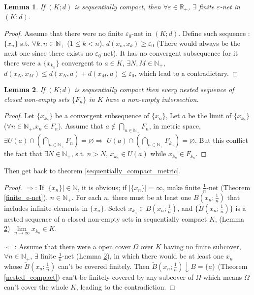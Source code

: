\documentclass[openany]{book}
\theoremstyle{plain}
\newtheorem{lemma}{Lemma} %
\theoremstyle{definition}
\begin{document}
\begin{lemma}\label{sequentially_compact_finite_e-net}
	If $(K;d)$ is sequentially compact, then $\forall \varepsilon\in\mathbb{R}_+$, $\exists$ finite $\varepsilon$-net in $(K;d)$. 
\end{lemma}
\begin{proof}
	Assume that there were no finite  $\varepsilon_0$-net in $(K;d)$. Define such sequence : $ \{x_n\}$ s.t. $\forall k,n\in\mathbb{N}_+$ ($1\leq k< n$), $d(x_n,x_k)\geq\varepsilon_0$ (There would always be the next one since there exists no $\varepsilon_0$-net). It has no convergent subsequence for it there were a $\{x_{k_n}\}$ convergent to $a\in K$, $\exists N,M\in\mathbb{N}_+$, $d(x_N,x_M)\leq d(x_N,a)+d(x_M,a)\leq \varepsilon_0$, which lead to a contradictary. 
\end{proof}
\begin{lemma}\label{sequentially_compact_nested_closed}
If $(K;d)$ is sequentially compact then every nested sequence of closed non-empty sets $\{F_n\}$ in $K$ have a non-empty intersection.
\end{lemma}
\begin{proof}
	Let $\{x_{k_n}\}$ be a convergent subsequence of $\{x_n\}$, Let $a$ be the limit of $\{x_{k_n}\}$ ($\forall n\in\mathbb{N}_+$,$x_n\in F_n$). Assume that $a\notin \bigcap_{n\in\mathbb{N}_+}F_n$, in metric space, $\exists U(a)\cap \left(\bigcap_{n\in\mathbb{N}_+}F_n\right)=\varnothing\Rightarrow $ $U(a)\cap \left(\bigcap_{n\in\mathbb{N}_+}F_{k_n}\right)=\varnothing$. But this conflict the fact that $\exists N\in\mathbb{N}_+$, s.t. $n>N$, $x_{k_n}\in U(a)$ while $x_{k_n}\in F_{k_n}$.
\end{proof}
Then get back to theorem \ref{sequentially_compact_metric}. 
\begin{proof}

	$\Rightarrow$: If $\left|\{x_n\}\right|\in\mathbb{N}$, it is obvious; if $\left|\{x_n\}\right|=\infty$, make finite $\frac{1}{n}$-net (Theorem \ref{finite_e-net}), $n\in\mathbb{N}_+$. For each $n$, there must be at least one $B(x_n;\frac{1}{n})$ that includes infinite elements in $\{x_n\}$. Select $x_{k_n}\in B(x_n;\frac{1}{n})$, and $\{\tilde{B}(x_n;\frac{1}{n})\}$ is a nested sequence of a closed non-empty sets in sequentially compact $K$, (Lemma \ref{sequentially_compact_nested_closed}) $\lim\limits_{n\to \infty} x_{k_n} \in K$.
	
	$\Leftarrow$: Assume that there were a open cover $\Omega$ over $K$ having no finite subcover, $\forall n\in\mathbb{N}_+$, $\exists$ finite $\frac{1}{n}$-net (Lemma \ref{sequentially_compact_nested_closed}), in which there would be at least one $x_n$ whose $\tilde{B}(x_n;\frac{1}{n})$ can't be covered finitely. Then $\tilde{B}(x_n;\frac{1}{n})\downarrow B=\{a\}$ (Theorem \ref{nested_compact}) can't be finitely covered by any subcover of $\Omega$ which means $\Omega$ can't cover the whole $K$, leading to the contradiction.
\end{proof}
\end{document}
